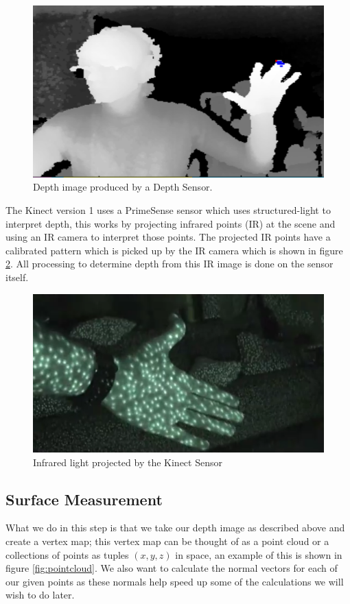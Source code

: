 \documentclass[10pt, twocolumn]{article}
\begin{document}
\begin{figure}[h!]
  \centering
  \includegraphics[width=0.8\linewidth]{depthimage}
  \caption{Depth image produced by a Depth Sensor.}
  \label{fig:depthimage}
\end{figure}

The Kinect version 1 uses a PrimeSense sensor which uses structured-light to
interpret depth, this works by projecting infrared points (IR) at the scene and
using an IR camera to interpret those points. The projected IR points have a
calibrated pattern which is picked up by the IR camera which is shown in figure
\ref{fig:ir}. All processing to determine depth from this IR image is done on
the sensor itself. 

\begin{figure}[h!]
  \centering
  \includegraphics[width=0.8\linewidth]{KinectIR}
  \caption{Infrared light projected by the Kinect Sensor}
  \label{fig:ir}
\end{figure}


\subsection{Surface Measurement}
What we do in this step is that we take our depth image as described above and create a vertex map; this vertex map can be thought of as a point cloud or a collections of points as tuples $(x, y, z)$ in space, an example of this is shown in figure \ref{fig:pointcloud}. We also want to calculate the normal vectors for each of our given points as these normals help speed up some of the calculations we will wish to do later.
\end{document}
